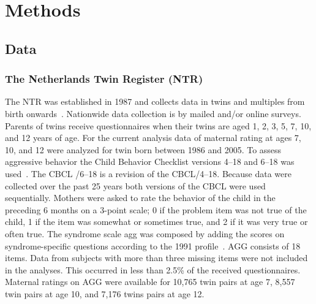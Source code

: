 ﻿\section{Methods}
\subsection{Data}
\label{sub:data_longhera}
\subsubsection{The Netherlands Twin Register (NTR)}
The NTR was established in 1987 and collects data in twins and multiples from birth onwards~\cite{Willemsen2013a}.
Nationwide data collection is by mailed and/or online surveys.
Parents of twins receive questionnaires when their twins are aged 1, 2, 3, 5, 7, 10, and 12 years of age.
For the current analysis data of maternal rating at ages 7, 10, and 12 were analyzed for twin born between 1986 and 2005.
To assess aggressive behavior the Child Behavior Checklist versions 4--18 and 6--18 was used~\cite{Achenbach2003}.
The CBCL /6--18 is a revision of the CBCL/4--18.
Because data were collected over the past 25 years both versions of the CBCL were used sequentially.
Mothers were asked to rate the behavior of the child in the preceding 6 months on a 3-point scale; 0 if the problem item was not true of the child, 1 if the item was somewhat or sometimes true, and 2 if it was very true or often true.
The syndrome scale \acrfull{agg} was composed by adding the scores on syndrome-specific questions according to the 1991 profile~\cite{Achenbach2003}.
AGG consists of 18 items.
Data from subjects with more than three missing items were not included in the analyses.
This occurred in less than 2.5\% of the received questionnaires.
Maternal ratings on AGG were available for 10,765 twin pairs at age 7, 8,557 twin pairs at age 10, and 7,176 twins pairs at age 12.

